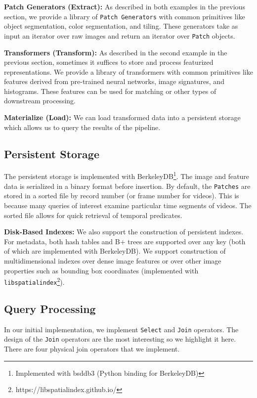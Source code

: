 \vspace{0.25em}
\noindent \textbf{Patch Generators (Extract): } As described in both examples in the previous section, we provide a library of \texttt{Patch Generators} with common primitives like object segmentation, color segmentation, and tiling. These generators take as input an iterator over raw images and return an iterator over \texttt{Patch} objects.

\vspace{0.25em}
\noindent \textbf{Transformers (Transform): } As described in the second example in the previous section, sometimes it suffices to store and process featurized representations. We provide a library of transformers with common primitives like features derived from pre-trained neural networks, image signatures, and histograms. These features can be used for matching or other types of downstream processing.

\vspace{0.25em}
\noindent \textbf{Materialize (Load): } We can load transformed data into a persistent storage which allows us to query the results of the pipeline.

\subsection{Persistent Storage}
The persistent storage is implemented with BerkeleyDB\footnote{Implemented with bsddb3 (Python binding for BerkeleyDB)}. The image and feature data is serialized in a binary format before insertion. By default, the \texttt{Patches} are stored in a sorted file by record number (or frame number for videos). This is because many queries of interest examine particular time segments of videos.
The sorted file allows for quick retrieval of temporal predicates.

\vspace{0.25em}
\noindent \textbf{Disk-Based Indexes: } We also support the construction of persistent indexes. For metadata, both hash tables and B+ trees are supported over any key (both of which are implemented with BerkeleyDB). We support construction of multidimensional indexes over dense image features or over other image properties such as bounding box coordinates (implemented with \texttt{libspatialindex}\footnote{https://libspatialindex.github.io/}).

\subsection{Query Processing}
In our initial implementation, we implement \texttt{Select} and \texttt{Join} operators. The design of the \texttt{Join} operators are the most interesting so we highlight it here. There are four physical join operators that we implement.   

